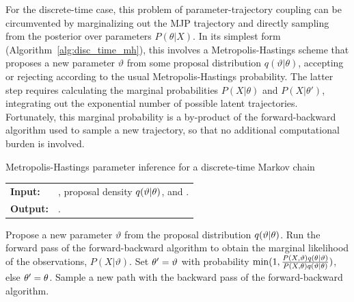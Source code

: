 For the discrete-time case, this problem of parameter-trajectory
coupling can be circumvented by marginalizing out the MJP trajectory 
and directly sampling from the posterior over parameters $P(\theta|X)$.
In its simplest form (Algorithm~\ref{alg:disc_time_mh}), this 
involves a Metropolis-Hastings scheme that proposes a new parameter 
$\vartheta$ from some proposal distribution 
$q(\vartheta|\theta)$, accepting or rejecting according to the usual
Metropolis-Hastings probability. The latter step requires calculating the 
marginal probabilities $P(X|\theta)$ and $P(X|\theta')$, integrating out
the exponential number of possible latent trajectories. Fortunately,
this marginal probability is a by-product of the forward-backward
algorithm used to sample a new trajectory, so that no 
additional computational burden is involved. 
\begin{algorithm}[H]
  \caption{Metropolis-Hastings parameter inference for a discrete-time 
Markov chain}
   \label{alg:disc_time_mh}
  \begin{tabular}{l l}
   \textbf{Input:  } & \text{Observations $X$},
   proposal density $q(\vartheta|\theta)$, and 
   \text{previous parameters $\ctheta$}.\\
   \textbf{Output:  }& \text{A new Markov chain parameter $\ntheta$}.\\
   \hline
   \end{tabular}
   \begin{algorithmic}[1]
  \State Propose a new parameter $\vartheta$ from the proposal distribution
  $q(\vartheta|\theta)$.
  \State Run the forward pass of the forward-backward algorithm to 
    obtain the marginal likelihood of the observations, $P(X|\vartheta)$.
    \State Set $\theta' = \vartheta$ with probability 
    $\min(1,\frac{P(X,\vartheta)q(\theta|\vartheta)}{P(X,\theta)q(\vartheta|\theta)})$, else 
    $\theta' = \theta$.
  \State Sample a new path with
    the backward pass of the forward-backward algorithm.
\end{algorithmic}
\end{algorithm}

\vspace{-.35in}
